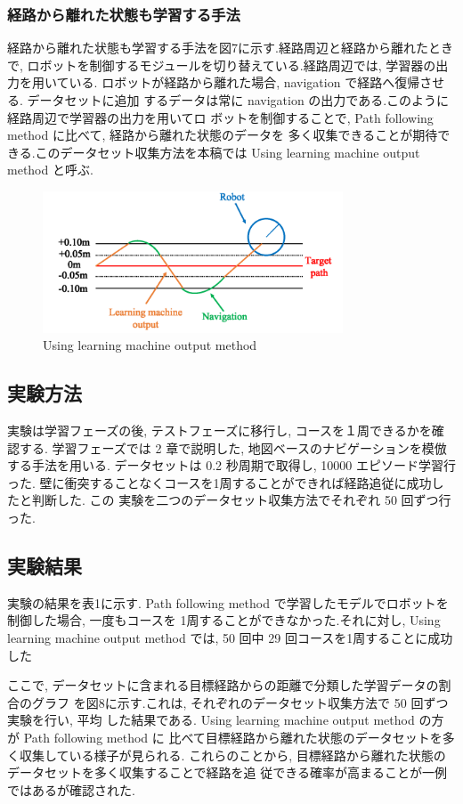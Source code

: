 \documentclass{jarticle}
\begin{document}
\subsubsection{経路から離れた状態も学習する手法}
経路から離れた状態も学習する手法を図7に示す.経路周辺と経路から離れたときで, 
ロボットを制御するモジュールを切り替えている.経路周辺では, 学習器の出力を用いている.
ロボットが経路から離れた場合,  navigation で経路へ復帰させる. データセットに追加
するデータは常に navigation の出力である.このように経路周辺で学習器の出力を用いてロ
ボットを制御することで,  Path following method に比べて, 経路から離れた状態のデータを
多く収集できることが期待できる.このデータセット収集方法を本稿では Using learning
machine output method と呼ぶ.

\begin{figure}[h!]
  \centering
   \includegraphics[height=42mm]{./figs/dl_use.png}
   \caption{Using learning machine output method}
\end{figure}

\subsection{実験方法}
実験は学習フェーズの後, テストフェーズに移行し, コースを１周できるかを確認する.
学習フェーズでは 2 章で説明した, 地図ベースのナビゲーションを模倣する手法を用いる.
データセットは 0.2 秒周期で取得し,  10000 エピソード学習行った.
壁に衝突することなくコースを1周することができれば経路追従に成功したと判断した. この
実験を二つのデータセット収集方法でそれぞれ 50 回ずつ行った.

\subsection{実験結果}
実験の結果を表1に示す. Path following method で学習したモデルでロボットを
制御した場合, 一度もコースを 1周することができなかった.それに対し, Using learning
machine output method では,  50 回中 29 回コースを1周することに成功した

ここで, データセットに含まれる目標経路からの距離で分類した学習データの割合のグラフ
を図8に示す.これは, それぞれのデータセット収集方法で 50 回ずつ実験を行い, 平均
した結果である. Using learning machine output method の方が Path following method に
比べて目標経路から離れた状態のデータセットを多く収集している様子が見られる.
これらのことから, 目標経路から離れた状態のデータセットを多く収集することで経路を追
従できる確率が高まることが一例ではあるが確認された.
\end{document}
